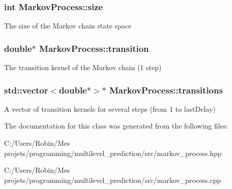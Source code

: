 \subsubsection[{size}]{\setlength{\rightskip}{0pt plus 5cm}int Markov\+Process\+::size}\label{class_markov_process_ad38170c3a73d113dc152e73bc57d0523}
The size of the Markov chain state space \hypertarget{class_markov_process_aae914f9e4fa973b5515bebc41508a289}{}
\subsubsection[{transition}]{\setlength{\rightskip}{0pt plus 5cm}double$\ast$ Markov\+Process\+::transition}\label{class_markov_process_aae914f9e4fa973b5515bebc41508a289}
The transition kernel of the Markov chain (1 step) \hypertarget{class_markov_process_a16e4250dba911530aff3d2766a367e5b}{}
\subsubsection[{transitions}]{\setlength{\rightskip}{0pt plus 5cm}std\+::vector$<$double$\ast$$>$$\ast$ Markov\+Process\+::transitions}\label{class_markov_process_a16e4250dba911530aff3d2766a367e5b}
A vector of transition kernels for several steps (from 1 to last\+Delay) 

The documentation for this class was generated from the following files\+:\begin{DoxyCompactItemize}
\item 
C\+:/\+Users/\+Robin/\+Mes projets/programming/multilevel\+\_\+prediction/src/markov\+\_\+process.\+hpp\item 
C\+:/\+Users/\+Robin/\+Mes projets/programming/multilevel\+\_\+prediction/src/markov\+\_\+process.\+cpp\end{DoxyCompactItemize}
